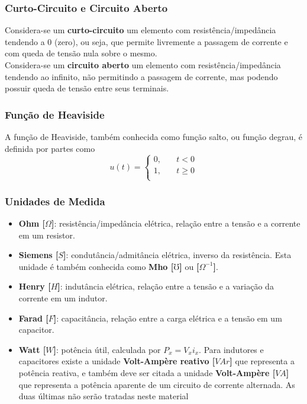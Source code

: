 \documentclass{article}
\numberwithin{equation}{section}
\begin{document}
    \subsubsection{Curto-Circuito e Circuito Aberto}
    Considera-se um \textbf{curto-circuito} um elemento com resistência/impedância tendendo a 0 (zero), ou seja, que permite livremente a passagem de corrente e com queda de tensão nula sobre o mesmo. \\
    \indent Considera-se um \textbf{circuito aberto} um elemento com resistência/impedância tendendo ao infinito, não permitindo a passagem de corrente, mas podendo possuir queda de tensão entre seus terminais.

    \subsubsection{Função de Heaviside}
    A função de Heaviside, também conhecida como função salto, ou função degrau, é definida por partes como
    $$ u(t) =
    \begin{cases}
        0, &\quad t<0 \\
        1, &\quad t\geqslant 0 \\
    \end{cases}
    $$

    \subsubsection{Unidades de Medida}
    \begin{itemize}
        \item \textbf{Ohm [$\Omega$]}: resistência/impedância elétrica, relação entre a tensão e a corrente em um resistor.
        \item \textbf{Siemens [$S$]}: condutância/admitância elétrica, inverso da resistência. Esta unidade é também conhecida como \textbf{Mho [$\mho$]} ou \textbf{[$\Omega^{-1}$]}.
        \item \textbf{Henry [$H$]}: indutância elétrica, relação entre a tensão e a variação da corrente em um indutor.
        \item \textbf{Farad [$F$]}: capacitância, relação entre a carga elétrica e a tensão em um capacitor.
        \item \textbf{Watt [$W$]}: potência útil, calculada por $P_x=V_xi_x$. Para indutores e capacitores existe a unidade \textbf{Volt-Ampère reativo [$VAr$]} que representa a potência reativa, e também deve ser citada a unidade \textbf{Volt-Ampère [$VA$]} que representa a potência aparente de um circuito de corrente alternada. As duas últimas não serão tratadas neste material
    \end{itemize}
\end{document}

